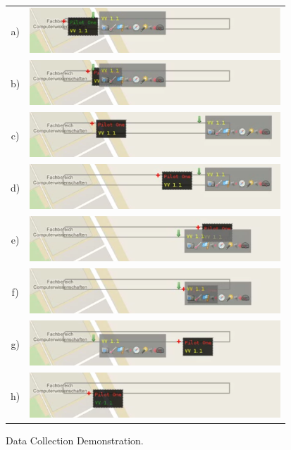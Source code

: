 \begin{figure}[h]
	\begin{center}
		\begin{tabular}{cc}
			a)&{\includegraphics[width=9.4cm]{ese-demo1-1.png}} \\
			b)&{\includegraphics[width=9.4cm]{ese-demo1-2.png}} \\
			
			c)&{\includegraphics[width=9.4cm]{ese-demo1-3.png}} \\
			d)&{\includegraphics[width=9.4cm]{ese-demo1-4.png}} \\
			
			e)&{\includegraphics[width=9.4cm]{ese-demo1-5.png}} \\
			f)&{\includegraphics[width=9.4cm]{ese-demo1-6.png}} \\
	
			g)&{\includegraphics[width=9.4cm]{ese-demo1-7.png}} \\
			h)&{\includegraphics[width=9.4cm]{ese-demo1-8.png}}
		\end{tabular}
	\end{center}
	\caption{Data Collection Demonstration.\label{fig:demo1}}
\end{figure}
